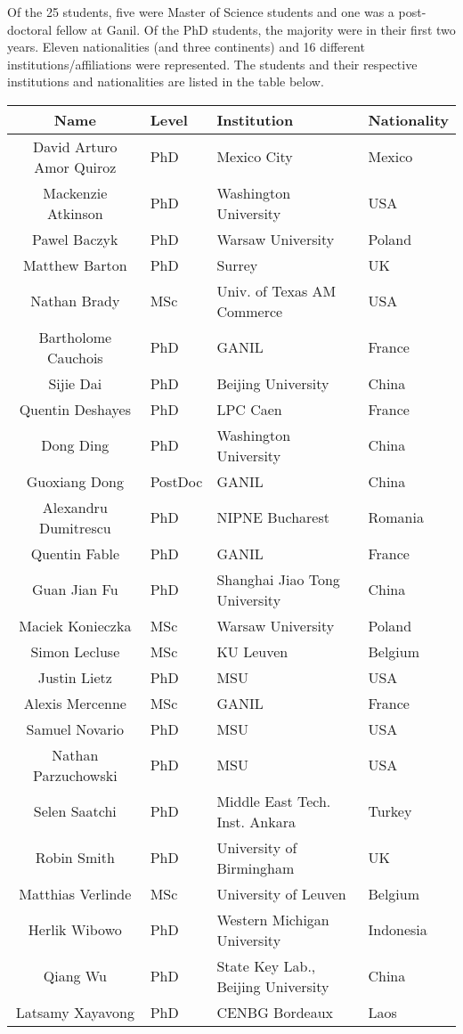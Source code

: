\documentclass[prc,amsart,english]{revtex4}
\begin{document}
Of the 25 students, five were Master of Science students and one was a post-doctoral fellow at Ganil. Of the PhD students, the majority
were in their first two years. Eleven nationalities (and three continents) and 16 different institutions/affiliations 
were represented.
The students and their respective institutions and nationalities  are listed in the table below. 
\begin{table}[hbtp]
  \begin{ruledtabular}
    \begin{tabular}{|c||l|l|l|}
     Name & Level &Institution &Nationality  \\\hline
David Arturo Amor Quiroz & PhD & Mexico City & Mexico  \\
Mackenzie Atkinson & PhD& Washington University & USA  \\
Pawel Baczyk & PhD& Warsaw University & Poland \\
Matthew Barton & PhD& Surrey & UK \\
Nathan Brady  & MSc& Univ. of Texas AM Commerce & USA \\
Bartholome Cauchois & PhD & GANIL & France \\
Sijie Dai & PhD& Beijing  University & China \\
Quentin Deshayes & PhD& LPC Caen & France \\
Dong Ding &PhD   & Washington University & China \\
Guoxiang Dong & PostDoc & GANIL & China \\
Alexandru Dumitrescu & PhD& NIPNE Bucharest & Romania \\
Quentin Fable & PhD& GANIL & France \\
Guan Jian Fu & PhD& Shanghai Jiao Tong University & China \\
Maciek Konieczka &MSc&  Warsaw University & Poland \\
Simon Lecluse & MSc & KU Leuven & Belgium \\
Justin Lietz & PhD& MSU & USA \\
Alexis Mercenne & MSc & GANIL & France \\
Samuel Novario & PhD& MSU & USA \\
Nathan Parzuchowski &PhD & MSU & USA \\
Selen Saatchi & PhD& Middle East Tech. Inst. Ankara & Turkey \\
Robin Smith & PhD& University of Birmingham & UK \\
Matthias Verlinde & MSc & University of Leuven & Belgium \\
Herlik Wibowo & PhD & Western Michigan University & Indonesia \\ 
Qiang Wu & PhD & State Key Lab., Beijing University & China \\
Latsamy Xayavong & PhD & CENBG Bordeaux & Laos \\ 
    \end{tabular}
  \end{ruledtabular}
\end{table} 
\end{document}
